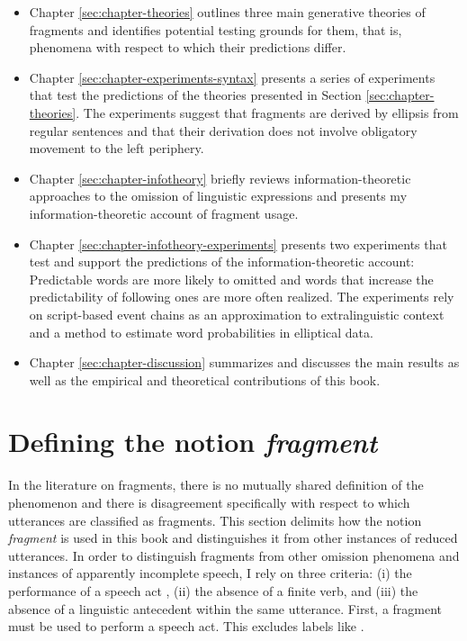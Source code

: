 \begin{itemize}\itemsep0em
 \item Chapter \ref{sec:chapter-theories} outlines three main generative theories of fragments and identifies potential testing grounds for them, that is, phenomena with respect to which their predictions differ.
 \item Chapter \ref{sec:chapter-experiments-syntax} presents a series of experiments that test the predictions of the theories presented in Section \ref{sec:chapter-theories}. The experiments suggest that fragments are derived by ellipsis from regular sentences and that their derivation does not involve obligatory movement to the left periphery.
 \item Chapter \ref{sec:chapter-infotheory} briefly reviews information-theoretic approaches to the omission of linguistic expressions and presents my information-theoretic account of fragment usage.
 \item Chapter \ref{sec:chapter-infotheory-experiments} presents two experiments that test and support the predictions of the infor\-ma\-tion-theoretic account: Predictable words are more likely to omitted and words that increase the predictability of following ones are more often realized. The experiments rely on script-based event chains as an approximation to extralinguistic context and a method to estimate word probabilities in elliptical data.
 \item Chapter \ref{sec:chapter-discussion} summarizes and discusses the main results as well as the empirical and theoretical contributions of this book.
\end{itemize}

\section{Defining the notion \textit{fragment}}

\label{sec:intro-fragments}
In the literature on fragments, there is no mutually shared definition of the phenomenon and there is disagreement specifically with respect to which utterances are classified as fragments. This section delimits how the notion \textit{fragment} is used in this book and distinguishes it from other instances of reduced utterances. In order to distinguish fragments from other omission phenomena and instances of apparently incomplete speech, I rely on three criteria: (i) the performance of a speech act \citep{morgan1973}, (ii) the absence of a finite verb, and (iii) the absence of a linguistic antecedent within the same utterance. First, a fragment must be used to perform a speech act. This excludes labels \citep{klein1993} like \Next.

